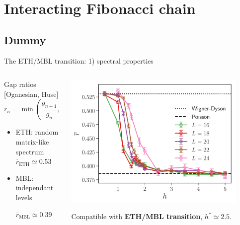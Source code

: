 \section{Interacting Fibonacci chain}
\subsection{Dummy}
\begin{frame}{The ETH/MBL transition: 1) spectral properties}
\begin{columns}
\begin{column}{0.5\textwidth}
Gap ratios {\footnotesize [Oganesian, Huse]}
\[
	r_n = \min\left(\frac{g_{n+1}}{g_n}, \frac{g_n}{g_{n+1}}\right)
\]
\begin{itemize}
	\item \textcolor{comp}{ETH: random matrix-like spectrum}
	$\overline{r}_\text{ETH} \simeq 0.53$
	\item \textcolor{BostonBlue}{MBL: independant levels}
	
	$\overline{r}_\text{MBL} \simeq 0.39$
\end{itemize}
\end{column}
\begin{column}{0.5\textwidth}
\centering
\includegraphics[width=0.9\textwidth]{img/3_Fibonacci/rgap}

Compatible with \textbf{ETH/MBL transition}, $h^* \simeq 2.5$.
\end{column}
\end{columns}
\end{frame}

